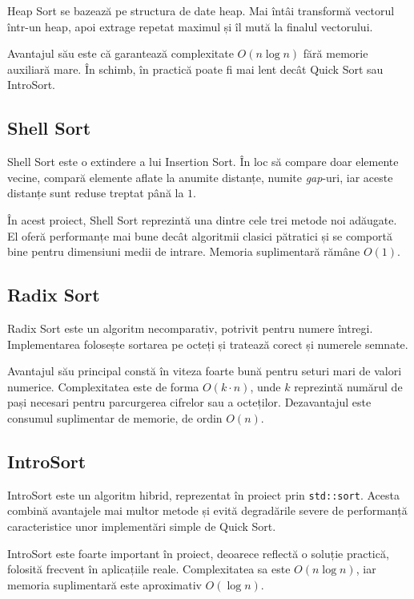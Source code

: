 \documentclass[12pt,a4paper]{article}
\begin{document}
Heap Sort se bazează pe structura de date heap. Mai întâi transformă vectorul într-un heap, apoi extrage repetat maximul și îl mută la finalul vectorului.

Avantajul său este că garantează complexitate $O(n \log n)$ fără memorie auxiliară mare. În schimb, în practică poate fi mai lent decât Quick Sort sau IntroSort.

\subsection{Shell Sort}

Shell Sort este o extindere a lui Insertion Sort. În loc să compare doar elemente vecine, compară elemente aflate la anumite distanțe, numite \emph{gap}-uri, iar aceste distanțe sunt reduse treptat până la $1$.

În acest proiect, Shell Sort reprezintă una dintre cele trei metode noi adăugate. El oferă performanțe mai bune decât algoritmii clasici pătratici și se comportă bine pentru dimensiuni medii de intrare. Memoria suplimentară rămâne $O(1)$.

\subsection{Radix Sort}

Radix Sort este un algoritm necomparativ, potrivit pentru numere întregi. Implementarea folosește sortarea pe octeți și tratează corect și numerele semnate.

Avantajul său principal constă în viteza foarte bună pentru seturi mari de valori numerice. Complexitatea este de forma $O(k \cdot n)$, unde $k$ reprezintă numărul de pași necesari pentru parcurgerea cifrelor sau a octeților. Dezavantajul este consumul suplimentar de memorie, de ordin $O(n)$.

\subsection{IntroSort}

IntroSort este un algoritm hibrid, reprezentat în proiect prin \texttt{std::sort}. Acesta combină avantajele mai multor metode și evită degradările severe de performanță caracteristice unor implementări simple de Quick Sort.

IntroSort este foarte important în proiect, deoarece reflectă o soluție practică, folosită frecvent în aplicațiile reale. Complexitatea sa este $O(n \log n)$, iar memoria suplimentară este aproximativ $O(\log n)$.
\end{document}

